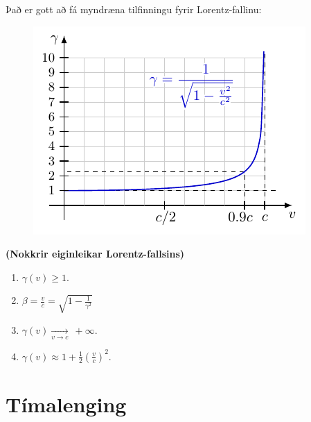 \ifdefined \wholebook \else\documentclass[oneside]{book}\usepackage{EdlBook}\graphicspath{{figures/}}
\begin{document}
Það er gott að fá myndræna tilfinningu fyrir Lorentz-fallinu:

\begin{figure}[H]
    \centering
    \includegraphics[width=.35\textwidth]{figures/gamma1.pdf}
\end{figure}


\begin{tcolorbox}
\begin{theorem}
\textbf{(Nokkrir eiginleikar Lorentz-fallsins)} 
\begin{enumerate}[label = \textbf{(\alph*)}]
    \item $\gamma(v) \geq 1$.
    \item $\beta = \frac{v}{c} = \sqrt{1 - \frac{1}{\gamma^2}}$
    \item $\gamma(v) \xrightarrow[v \to c]{}\ +\infty$.
    \item $\gamma(v) \approx 1 + \frac{1}{2}\left(\frac{v}{c}\right)^2$.
\end{enumerate}
\end{theorem}
\end{tcolorbox}


\section{Tímalenging}
\end{document}
